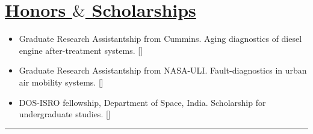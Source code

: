 \section*{\underline{Honors $\&$ Scholarships}}
\begin{itemize}
        \item Graduate Research Assistantship from Cummins. Aging diagnostics of diesel engine after-treatment systems.
        []
        \item Graduate Research Assistantship from NASA-ULI. Fault-diagnostics in urban air mobility systems.
        []
        \item DOS-ISRO fellowship, Department of Space, India. Scholarship for undergraduate studies.
        []
\end{itemize}

\noindent\rule{\textwidth}{0.4pt}

